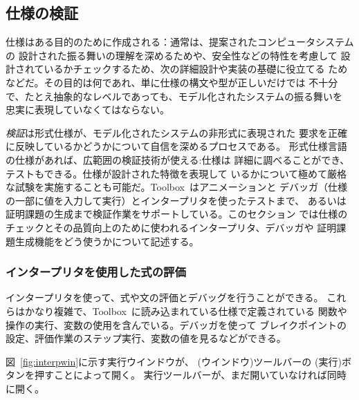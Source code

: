 \documentclass[\pformat,12pt]{jarticle}
\newcommand{\Toolbox}{Toolbox}
\newcommand{\guicmd}[1]{{\gt #1}}
\begin{document}

\subsection{仕様の検証}


仕様はある目的のために作成される：通常は、提案されたコンピュータシステムの
設計された振る舞いの理解を深めるためや、安全性などの特性を考慮して
設計されているかチェックするため、次の詳細設計や実装の基礎に役立てる
ためなどだ。その目的は何であれ、単に仕様の構文や型が正しいだけでは
不十分で、たとえ抽象的なレベルであっても、モデル化されたシステムの振る舞いを
忠実に表現していなくてはならない。

{\em 検証\/}は形式仕様が、モデル化されたシステムの非形式に表現された
要求を正確に反映しているかどうかについて自信を深めるプロセスである。
形式仕様言語の仕様があれば、広範囲の検証技術が使える:仕様は
詳細に調べることができ、テストもできる。仕様が設計された特徴を表現して
いるかについて極めて厳格な試験を実施することも可能だ。\Toolbox\ はアニメーションと
デバッガ（仕様の一部に値を入力して実行）とインタープリタを使ったテストまで、
あるいは証明課題の生成まで検証作業をサポートしている。このセクション
では仕様のチェックとその品質向上のために使われるインタープリタ、デバッガや
証明課題生成機能をどう使うかについて記述する。

\subsubsection{インタープリタを使用した式の評価}
\label{interpreter}


インタープリタを使って、式や文の評価とデバッグを行うことができる。
これらはかなり複雑で、\Toolbox\ に読み込まれている仕様で定義されている
関数や操作の実行、変数の使用を含んでいる。デバッガを使って
ブレイクポイントの設定、評価作業のステップ実行、変数の値を見るなどができる。

図~\ref{fig:interpwin}に示す\guicmd{実行ウインドウ}が、
(\guicmd{ウインドウ})ツールバーの  
(\guicmd{実行})ボタンを押すことによって開く。
\guicmd{実行}ツールバーが、まだ開いていなければ同時に開く。
\end{document}

